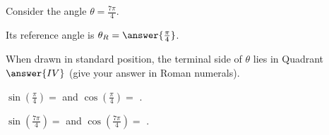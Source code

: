 \documentclass{ximera}
\author{Kenneth Berglund}
\begin{document}
\begin{exercise}
Consider the angle $\theta = \frac{7\pi}{4}$. 

Its reference angle is $\theta_R = \answer{\frac{\pi}{4}}$.

When drawn in standard position, the terminal side of $\theta$ lies in Quadrant $\answer{IV}$ (give your answer in Roman numerals). 

\begin{exercise}
$\sin\left(\frac{\pi}{4}\right)=$\wordChoice{\choice[correct]{$+$}\choice{$-$}}  and $\cos\left(\frac{\pi}{4}\right) =$\wordChoice{\choice[correct]{$+$}\choice{$-$}} .

\begin{exercise}
$\sin\left(\frac{7\pi}{4}\right)=$\wordChoice{\choice{$+$}\choice[correct]{$-$}}  and $\cos\left(\frac{7\pi}{4}\right) =$\wordChoice{\choice[correct]{$+$}\choice{$-$}} .
\end{exercise}
\end{exercise}

\end{exercise}
\end{document}
